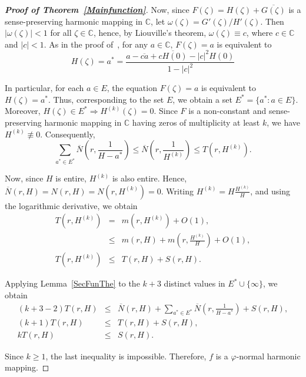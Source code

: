 \documentclass[11pt, reqno]{amsart}
\numberwithin{equation}{section}
\theoremstyle{definition}
\theoremstyle{remark}
\theoremstyle{plain}
\begin{document}
\begin{proof}[\bf{Proof of Theorem~\ref{Mainfunction}}]
Now, since $F(\zeta)=H(\zeta)+\overline{G(\zeta)}$ is a 
sense-preserving harmonic mapping in $\mathbb{C}$, let 
$\omega(\zeta)=G'(\zeta)/H'(\zeta)$. Then $|\omega(\zeta)|<1$ for 
all $\zeta \in \mathbb{C}$, hence, by Liouville's theorem, 
$\omega(\zeta)\equiv c$, where $c \in \mathbb{C}$ 
and $|c|<1$. As in the proof of~\cite[Lemma 2.5]{Bohra}, for any
$a\in \mathbb{C}, \,  F(\zeta)=a$ is equivalent to
\begin{equation}\label{eq: HequiF}
  H(\zeta)=a^*= \frac{a-\overline{ca}+\overline{cH(0)}-|c|^2H(0)}{1-|c|^2}
\end{equation}

In particular, for each $a\in E$, the equation $F(\zeta)=a$ is
 equivalent to $H(\zeta)=a^*$. Thus, corresponding to the set
$ E$, we obtain a set $E^*=\{a^*: a\in E \}$. Moreover,
$H(\zeta)\in E^* \Longrightarrow H^{(k)}(\zeta)=0$. Since $F$ 
is a non-constant and sense-preserving harmonic mapping in
 $\mathbb{C}$ having zeros of multiplicity at least
$k$, we have $H^{(k)}\not\equiv 0$. Consequently,
\[
\sum_{a^* \in E^*}\overline{N}\left(r, \frac{1}{H-a^*}\right)\leq  
\overline{N}\left(r, \frac{1}{H^{(k)}}\right)\leq T(r,H^{(k)}).
\] 

Now, since $H$ is entire, $H^{(k)}$ is also entire. Hence,
$\overline{N}(r,H)= N(r,H)=
    N(r,H^{(k)})=0$. Writing $H^{(k)}=H\frac{H^{(k)}}{H}$, 
    and using the logarithmic derivative, we 
    obtain  
    \begin{eqnarray}\label{logrderiv}
    T(r,H^{(k)})&=&m(r,H^{(k)})+O(1),\nonumber \\
    &\leq& m(r,H)+m(r,\frac{H^{(k)}}{H})+O(1),\nonumber \\
    T(r,H^{(k)})&\leq& T(r,H)+S(r,H).
   \end{eqnarray}

   Applying Lemma~\ref{SecFunThe} to the $k+3$ distinct values
   in $E^*\cup \{\infty\}$, we obtain   
\begin{eqnarray*}
  (k+3-2)T(r,H) &\leq &\overline{N}(r,H) +\sum_{a^* \in E^*}
  \overline{N}\left(r,\frac{1}{H-a^*}\right) +S(r,H), \\
  (k+1)T(r,H)&\leq& T(r,H)+S(r,H),  \\
    kT(r,H) &\leq& S(r,H).
\end{eqnarray*} 

Since $k \geq 1$, the last inequality is impossible. Therefore, $f$ 
is a $\varphi$-normal harmonic mapping.
\end{proof}\medskip
\end{document}
